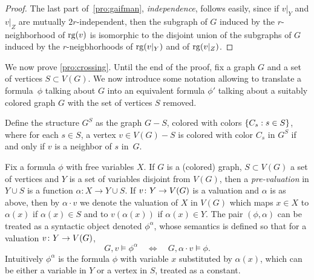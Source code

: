 \begin{proof}
The last part of~\cref{pro:gaifman}, \emph{independence}, follows easily, since if $v|_Y$ and $v|_Z$ are mutually $2r$-independent, then the subgraph of $G$ induced by the $r$-neighborhood of $\mathrm{rg}(v)$ is isomorphic to the disjoint union of the subgraphs of $G$ induced by the $r$-neigbhorhoods of $\mathrm{rg}(v|_Y)$
and of $\mathrm{rg}(v|_Z)$.
\end{proof}

\medskip
We now prove \cref{pro:crossing}. Until the end of the proof, fix a graph $G$ and a set of vertices $S\subset V(G)$.
We now introduce some notation allowing to translate a  formula~$\phi$ talking about  $G$ into an equivalent formula $\phi'$ talking 
about a suitably colored  graph $G$ with the set of vertices $S$ removed.

Define the structure $G^{S}$
as the graph $G-S$, colored with colors $\{C_s: s\in S\}$,
where for each $s\in S$, a vertex $v\in V(G)-S$
is colored with color $C_s$ in $G^S$ if and only if $v$ is a neighbor of $s$
in~$G$.

Fix a formula $\phi$ with free variables $X$.
If $G$ is a (colored) graph, $S\subset V(G)$ a set of vertices and $Y$ is a set of variables disjoint from $V(G)$, then 
a \emph{pre-valuation} in $Y\cup S$ is a 
function $\alpha\colon X\to Y\cup S$.
If $v\colon Y\to V(G)$ is a valuation and $\alpha$ is as above,
then by $\alpha\cdot v$ we denote the valuation of $X$ in $V(G)$
which maps $x\in X$ to $\alpha(x) $ if $\alpha(x)\in S$
and to $v(\alpha(x))$ if $\alpha(x)\in Y$.
 The  pair $(\phi,\alpha)$  can be treated as a
syntactic object denoted  $\phi^{\alpha}$,
 whose semantics is defined so that for a valuation $v\colon Y\to V(G)$, 
$$G,v\models \phi^{\alpha}\quad\Leftrightarrow \quad G,\alpha\cdot v\models \phi.$$
Intuitively $\phi^\alpha$ is the formula $\phi$ with variable $x$ substituted by $\alpha(x)$,
which can be either a variable in $Y$ or a vertex in $S$, treated as a constant.


